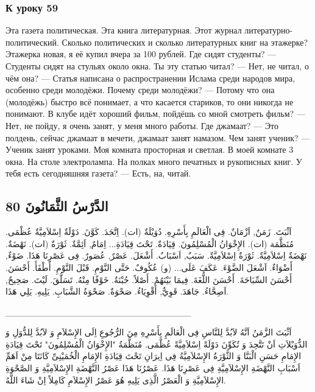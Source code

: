 \documentclass[a5paper]{article}
\begin{document}
\subsubsection{К уроку 59}
Эта газета политическая. Эта книга литературная. Этот журнал литературно-политический. Сколько политических и сколько литера­турных книг на этажерке? Этажерка новая, я её купил вчера за 100 рублей. Где сидят студенты? — Студенты сидят на стульях около окна. Ты эту статью читал? — Нет, не читал, о чём она? — Статья написана о распространении Ислама среди народов мира, особенно среди молодёжи. Почему среди молодёжи? — Потому что она (молодёжь) быстро всё понимает, а что касается стариков, то они никогда не понимают. В клубе идёт хороший фильм, пойдёшь со мной смотреть фильм? — Нет, не пойду, я очень занят, у меня много работы. Где джамаат? — Это полдень, сейчас джамаат в мечети, джамаат занят намазом. Чем занят ученик? — Ученик занят уроками. Моя комната просторная и светлая. В моей комнате 3 окна. На столе электролампа. На полках много печатных и рукописных книг. У тебя есть сегодняшняя газета? — Есть, на, читай.

\subsection{الدَّرْسُ الثَّمَانُونَ 80}
اَثْبَتَ. زَمَنٌ, اَزْمَانٌ. فِى الْعَالَمِ بِأَسْرِهِ. دُوَيْلَةٌ (ات). اِتَّحَدَ. كَوَّنَ. دَوْلَةٌ اِسْلاَمِيَّةٌ عُظْمَى. مُنَظَّمَة (ات). الإِخْوَانُ الْمُسْلِمُونَ. قِيَادَةٌ. تَحْتَ قِيَادَةِ... اِمَامٌ, اَئِمَّةٌ. ثَوْرَةٌ (ات). نَهْضَةٌ. نَهْضَةٌ اِسْلاَمِيَّةٌ. ثَوْرَةٌ اِسْلاَمِيَّةٌ. سَبَبٌ, اَسْبَابٌ. أَشْعَلَ. عَصْرٌ, عُصَورٌ. فِى عَصْرِنَا هَذَا. ضَوْءٌ, أَضْوَاءٌ. اَشْعَلَ الضَّوْءَ. عَكَفَ عَلَى... (و) عُكُوفٌ. حَتَّى النَّوْمِ. قَبْلَ النَّوْمِ. أَطْفَأَ. أَحْسَنَ. أَحْسَنَ السِّبَاحَةَ. أَحْسَنَ اللُّغَةَ. فِيمَا بَيْنَهُمْ. أَصْلاً. جُبْنَةٌ. خَوْفًا مِنْهُ. تَسَلَّقَ. لَيْتَ. صَحِيحٌ, اَصِحَّاءُ. جَاهَدَ. قَوِيٌّ, أَقْوِيَاءُ. صَحْوَةٌ. صَحْوَةُ الشَّبَابِ. يَلِيهِ. يَلِي هَذَا.

\_\_\_\_\_\_\_\_\_\_\_\_\_\_\_\_\_\_\_\_\_\_\_\_\_\_\_\_\_

اَثْبَتَ الزَّمَنُ اَنَّهُ لاَبُدَّ لِلنَّاسِ فِى الْعَالَمِ بِأَسْرِهِ مِنَ الرُّجُوعِ اِلَى الإِسْلاَمِ وَ لاَبُدَّ لِلدُّوَلِ وَ الدُّوَيْلاَتِ اَنْ تَتَّحِدَ وَ تُكَوِّنَ دَوْلَةً اِسْلاَمِيَّةً عُظْمَى. مُنَظَّمَةُ "الإِخْوَانُ الْمُسْلِمُونَ" تَحْتَ قِيَادَةِ الإِمَامِ حَسَنِ الْبَنَّا وَ الثَّوْرَةُ الإِسْلاَمِيَّةُ فِى اِيرَانِ تَحْتَ قِيَادَةِ الإِمَامِ الْخُمَيْنِىِّ كَانَتَا مِنْ اَهَمِّ اَسْبَابِ النَّهْضَةِ الإِسْلاَمِيَّةِ فِى عَصْرِنَا هَذَا. عَصْرُنَا هَذَا عَصْرُ النَّهْضَةِ الإِسْلاَمِيَّةِ وَ الصَّحْوَةِ الإِسْلاَمِيَّةِ وَ الْعَصْرُ الَّذِى يَلِيهِ هُوَ عَصْرُ الإِسْلاَمِ كَامِلاً اِنْ شَاءَ اللَّهُ.
\end{document}
